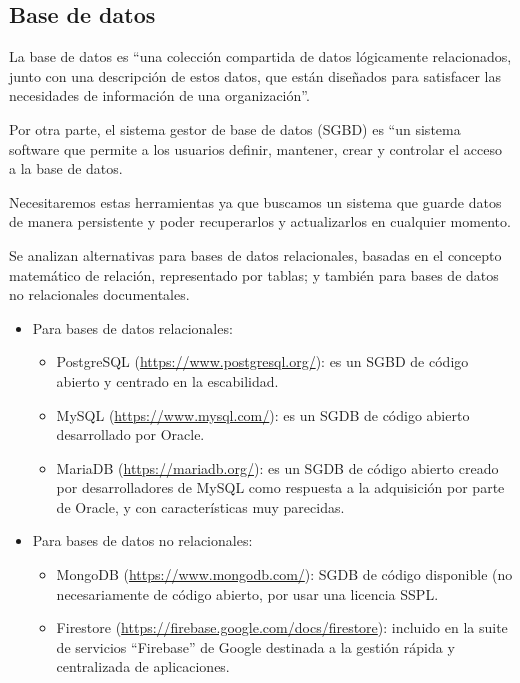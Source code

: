 \subsection{Base de datos}

La base de datos es ``una colección compartida de datos lógicamente relacionados, junto con una descripción de estos datos, que están diseñados para satisfacer las necesidades de información de una organización''.\cite{alma991009264529704990}

Por otra parte, el sistema gestor de base de datos (SGBD) es ``un sistema software que permite a los usuarios definir, mantener, crear y controlar el acceso a la base de datos.\cite{alma991009264529704990}

Necesitaremos estas herramientas ya que buscamos un sistema que guarde datos de manera persistente y poder recuperarlos y actualizarlos en cualquier momento.

Se analizan alternativas para bases de datos relacionales, basadas en el concepto matemático de relación, representado por tablas\cite{alma991009264529704990}; y también para bases de datos no relacionales documentales.

\begin{itemize}
    \item Para bases de datos relacionales:
    \begin{itemize}
        \item PostgreSQL (\url{https://www.postgresql.org/}): es un SGBD de código abierto y centrado en la escabilidad.
        \item MySQL (\url{https://www.mysql.com/}): es un SGDB de código abierto desarrollado por Oracle.
        \item MariaDB (\url{https://mariadb.org/}): es un SGDB de código abierto creado por desarrolladores de MySQL como respuesta a la adquisición por parte de Oracle, y con características muy parecidas.
    \end{itemize}
    \item Para bases de datos no relacionales:
    \begin{itemize}
        \item MongoDB (\url{https://www.mongodb.com/}): SGDB de código disponible (no necesariamente de código abierto, por usar una licencia SSPL.\cite{ssplLicense}
        \item Firestore (\url{https://firebase.google.com/docs/firestore}): incluido en la suite de servicios ``Firebase'' de Google destinada a la gestión rápida y centralizada de aplicaciones.
    \end{itemize}
\end{itemize}


